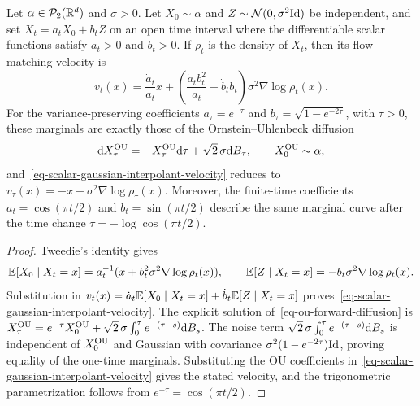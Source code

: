 \begin{prop}\label{prop-static-ou-equivalence}
	Let $\alpha\in\mathcal{P}_2(\mathbb{R}^d)$ and $\sigma>0$. Let $X_0\sim\alpha$ and $Z\sim\mathcal{N}(0,\sigma^2\mathrm{Id})$ be independent, and set $X_t=a_tX_0+b_tZ$ on an open time interval where the differentiable scalar functions satisfy $a_t>0$ and $b_t>0$. If $\rho_t$ is the density of $X_t$, then its flow-matching velocity is
	\begin{equation}\label{eq-scalar-gaussian-interpolant-velocity}
		v_t(x)=\frac{\dot a_t}{a_t}x+
		\left(\frac{\dot a_t b_t^2}{a_t}-\dot b_t b_t\right)\sigma^2\nabla\log \rho_t(x).
	\end{equation}
	For the variance-preserving coefficients $a_\tau=e^{-\tau}$ and $b_\tau=\sqrt{1-e^{-2\tau}}$, with $\tau>0$, these marginals are exactly those of the Ornstein--Uhlenbeck diffusion
	\begin{equation}\label{eq-ou-forward-diffusion}
		\mathrm{d} X_\tau^{\rm OU}=-X_\tau^{\rm OU}\mathrm{d}\tau+\sqrt{2}\,\sigma\mathrm{d} B_\tau,
		\qquad X_0^{\rm OU}\sim\alpha,
	\end{equation}
	and~\eqref{eq-scalar-gaussian-interpolant-velocity} reduces to $v_\tau(x)=-x-\sigma^2\nabla\log \rho_\tau(x)$. Moreover, the finite-time coefficients $a_t=\cos(\pi t/2)$ and $b_t=\sin(\pi t/2)$ describe the same marginal curve after the time change $\tau=-\log\cos(\pi t/2)$.
\end{prop}

\begin{proof}
	Tweedie's identity gives
	\[
	\mathbb{E}[X_0\mid X_t=x]=a_t^{-1}(x+b_t^2\sigma^2\nabla\log\rho_t(x)),
	\qquad
	\mathbb{E}[Z\mid X_t=x]=-b_t\sigma^2\nabla\log\rho_t(x).
	\]
	Substitution in $v_t(x)=\dot a_t\mathbb{E}[X_0\mid X_t=x]+\dot b_t\mathbb{E}[Z\mid X_t=x]$ proves~\eqref{eq-scalar-gaussian-interpolant-velocity}. The explicit solution of~\eqref{eq-ou-forward-diffusion} is $X_\tau^{\rm OU}=e^{-\tau}X_0^{\rm OU}+\sqrt{2}\,\sigma\int_0^\tau e^{-(\tau-s)}\mathrm{d} B_s$. The noise term $\sqrt{2}\,\sigma\int_0^\tau e^{-(\tau-s)}\mathrm{d} B_s$ is independent of $X_0^{\rm OU}$ and Gaussian with covariance $\sigma^2(1-e^{-2\tau})\mathrm{Id}$, proving equality of the one-time marginals. Substituting the OU coefficients in~\eqref{eq-scalar-gaussian-interpolant-velocity} gives the stated velocity, and the trigonometric parametrization follows from $e^{-\tau}=\cos(\pi t/2)$.
\end{proof}

